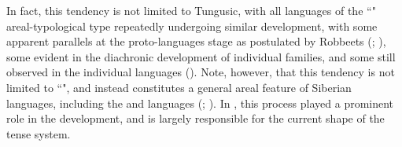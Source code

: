 \documentclass[output=paper,colorlinks,citecolor=brown]{langscibook}
\begin{document}
\begin{sloppypar}
In fact, this tendency is not limited to Tungusic, with all languages of the ``" areal-typological type repeatedly undergoing similar development, with some apparent parallels at the proto-languages stage as postulated by Robbeets (\citeyear{Robbeets_2009}; \citeyear{Robbeets_2015}), some evident in the diachronic development of individual families, and some still observed in the individual languages (\citealt{Malchukov_Czerwinski_2020}). Note, however, that this tendency is not limited to ``", and instead constitutes a general areal feature of Siberian languages, including the  and  languages (\citealt{Malchukov_2013}; \citealt{Malchukov_Czerwinski_2021}). In , this process played a prominent role in the development, and is largely responsible for the current shape of the  tense system.
\end{sloppypar}
\end{document}
